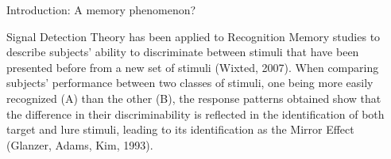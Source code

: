 \documentclass[final]{beamer}
\newlength{\sepwid}
\newlength{\onecolwid}
\begin{document}
\begin{frame}[t]


\begin{columns}[t] %
\begin{column}{\sepwid}\end{column} %
\begin{column}{\onecolwid} %


\begin{alertblock}{Introduction: A memory phenomenon?}

Signal Detection Theory has been applied to Recognition Memory studies to describe subjects’ ability to discriminate between stimuli that have been presented before from a new set of stimuli (Wixted, 2007). When comparing subjects' performance between two classes of stimuli, one being more easily recognized (A) than the other (B), the response patterns obtained show that the difference in their discriminability is reflected in the identification of both target and lure stimuli, leading to its identification as the Mirror Effect (Glanzer, Adams, Kim, 1993).



\end{alertblock}
\end{column}
\end{columns}
\end{frame}
\end{document}
